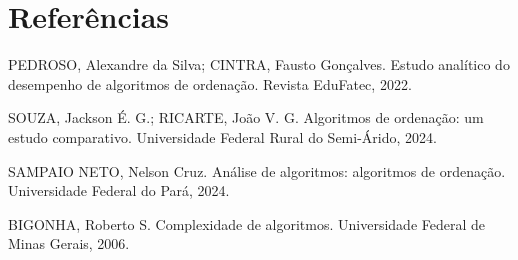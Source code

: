 \documentclass[12pt, a4paper]{report}
\begin{document}
\chapter*{Referências}

PEDROSO, Alexandre da Silva; CINTRA, Fausto Gonçalves. Estudo analítico do desempenho de algoritmos de ordenação. Revista EduFatec, 2022.

SOUZA, Jackson É. G.; RICARTE, João V. G. Algoritmos de ordenação: um estudo comparativo. Universidade Federal Rural do Semi-Árido, 2024.

SAMPAIO NETO, Nelson Cruz. Análise de algoritmos: algoritmos de ordenação. Universidade Federal do Pará, 2024.

BIGONHA, Roberto S. Complexidade de algoritmos. Universidade Federal de Minas Gerais, 2006.
\end{document}
